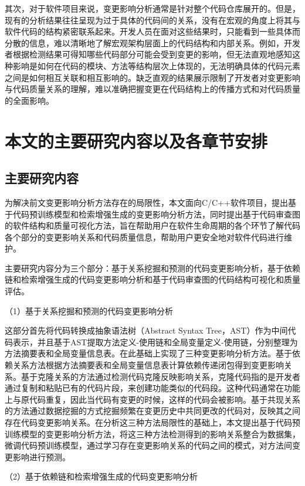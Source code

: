 其次，对于软件项目来说，变更影响分析通常是针对整个代码仓库展开的。但是，现有的分析结果往往呈现为过于具体的代码间的关系，没有在宏观的角度上将其与软件代码的结构紧密联系起来。开发人员在面对这些结果时，只能看到一些具体而分散的信息，难以清晰地了解宏观架构层面上的代码结构和内部关系。例如，开发者根据检测结果可得知哪些代码部分可能会受到变更的影响，但无法直观地感知这种影响是如何在代码的模块、方法等结构层次上体现的，无法明确具体的代码元素之间是如何相互关联和相互影响的。缺乏直观的结果展示限制了开发者对变更影响与代码质量关系的理解，难以准确把握变更在代码结构上的传播方式和对代码质量的全面影响。




\section{本文的主要研究内容以及各章节安排}
\subsection{主要研究内容}

为解决前文变更影响分析方法存在的局限性，本文面向C/C++软件项目，提出基于代码预训练模型和检索增强生成的变更影响分析方法，同时提出基于代码审查图的软件结构和质量可视化方法，旨在帮助用户在软件生命周期的各个环节了解代码各个部分的变更影响关系和代码质量信息，帮助用户更安全地对软件代码进行维护。

主要研究内容分为三个部分：基于关系挖掘和预测的代码变更影响分析，基于依赖链和检索增强生成的代码变更影响分析和基于代码审查图的代码结构可视化和质量评估。

（1）基于关系挖掘和预测的代码变更影响分析

这部分首先将代码转换成抽象语法树（Abstract Syntax Tree，AST）作为中间代码表示，并且基于AST提取方法定义-使用链和全局变量定义-使用链，分别整理为方法摘要表和全局变量信息表。在此基础上实现了三种变更影响分析方法。基于依赖关系方法根据方法摘要表和全局变量信息表计算依赖传递闭包得到变更影响关系。基于克隆关系的方法通过检测代码克隆反映影响关系，克隆代码指的是开发者通过复制和粘贴已有的代码片段，来创建功能类似的代码段。这种代码通常在功能上与原代码重复，因此当代码有变更的时候，这样的代码会被影响。基于共现关系的方法通过数据挖掘的方式挖掘频繁在变更历史中共同更改的代码对，反映其之间存在代码变更影响关系。在分析这三种方法局限性的基础上，本文提出基于代码预训练模型的变更影响分析方法，将这三种方法检测得到的影响关系整合为数据集，微调代码预训练模型，通过学习存在变更影响关系的代码之间的模式，对方法间变更影响进行预测。


（2）基于依赖链和检索增强生成的代码变更影响分析

